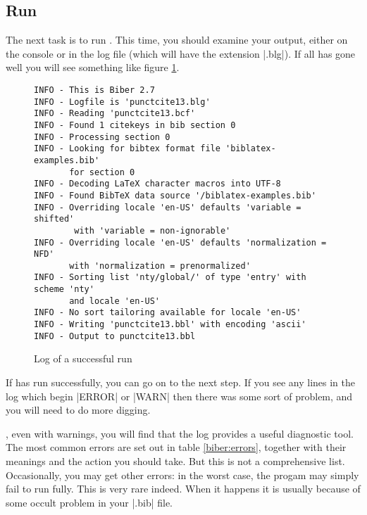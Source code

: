 \subsection{Run }

The next task is to run .  This time, you should
examine your output, either on the console or in the log file (which
will have the extension |.blg|). If all has gone well you will see
something like figure \ref{biber:run}.
\begin{figure}
\begin{Verbatim}[frame=single,fontsize=\small]
INFO - This is Biber 2.7
INFO - Logfile is 'punctcite13.blg'
INFO - Reading 'punctcite13.bcf'
INFO - Found 1 citekeys in bib section 0
INFO - Processing section 0
INFO - Looking for bibtex format file 'biblatex-examples.bib'
       for section 0
INFO - Decoding LaTeX character macros into UTF-8
INFO - Found BibTeX data source '/biblatex-examples.bib'
INFO - Overriding locale 'en-US' defaults 'variable = shifted'
        with 'variable = non-ignorable'
INFO - Overriding locale 'en-US' defaults 'normalization = NFD'
       with 'normalization = prenormalized'
INFO - Sorting list 'nty/global/' of type 'entry' with scheme 'nty'
       and locale 'en-US'
INFO - No sort tailoring available for locale 'en-US'
INFO - Writing 'punctcite13.bbl' with encoding 'ascii'
INFO - Output to punctcite13.bbl
\end{Verbatim}
\caption{Log of a successful  run\label{biber:run}}
\end{figure}

If  has run successfully, you can go on to the next
step. If you see any lines in the log which begin |ERROR| or |WARN|
then there was some sort of problem, and you will need to do more
digging.

, even with
warnings, you will find that the log provides a useful diagnostic
tool. The most common errors are set out in table \ref{biber:errors},
together with their meanings and the action you should take. But this
is not a comprehensive list. Occasionally, you may get other errors:
in the worst case, the progam may simply fail to run fully. This is
very rare indeed. When it happens it is usually because of some occult
problem in your |.bib| file.

